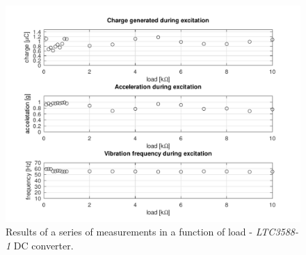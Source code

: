 \documentclass[12pt,a4paper]{article}
\begin{document}
\begin{figure}[ht!]
\includegraphics[scale=0.75]{results3588.pdf}
\caption{Results of a series of measurements in a function of load - \textit{LTC3588-1} DC converter.}
\label{fig:results3588}
\end{figure}
\end{document}
